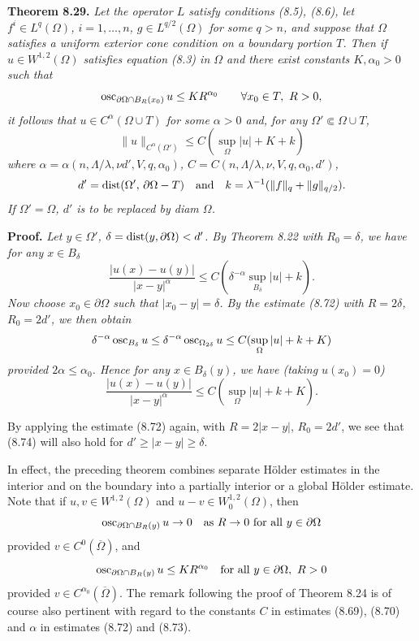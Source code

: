 \noindent \textbf{Theorem 8.29.} \emph{Let the operator $L$ satisfy conditions (8.5), (8.6), let $f^i \in L^q(\Omega)$, $i = 1,\dots,n$, $g \in L^{q/2}(\Omega)$ for some $q > n$, and suppose that $\Omega$ satisfies a uniform exterior cone condition on a boundary portion $T$. Then if $u \in W^{1,2}(\Omega)$ satisfies equation (8.3) in $\Omega$ and there exist constants $K,\alpha_0 > 0$ such that}
\[
\operatorname{osc}_{\partial\Omega \cap B_R(x_0)} u \le K R^{\alpha_0} \qquad \forall x_0 \in T,\ R > 0,
\]
\emph{it follows that $u \in C^\alpha(\Omega \cup T)$ for some $\alpha > 0$ and, for any $\Omega' \Subset \Omega \cup T$,}
\begin{equation}
\|u\|_{C^\alpha(\Omega')} \le C(\sup_{\Omega} |u| + K + k)
\tag{8.73}
\end{equation}
\emph{where $\alpha = \alpha(n, \Lambda/\lambda, \nu d', V, q, \alpha_0)$, $C = C(n, \Lambda/\lambda, \nu, V, q, \alpha_0, d')$,}
\[
d' = \operatorname{dist}(\Omega',\, \partial\Omega - T) \quad \text{and} \quad k = \lambda^{-1}(\|f\|_q + \|g\|_{q/2}).
\]
\emph{If $\Omega' = \Omega$, $d'$ is to be replaced by diam $\Omega$.}

\medskip

\noindent \textbf{Proof.} \emph{Let $y \in \Omega'$, $\delta = \operatorname{dist}(y, \partial\Omega) < d'$. By Theorem 8.22 with $R_0 = \delta$, we have for any $x \in B_\delta$}
\[
\frac{|u(x) - u(y)|}{|x - y|^\alpha} \le C(\delta^{-\alpha}\sup_{B_\delta}|u| + k).
\]
\emph{Now choose $x_0 \in \partial\Omega$ such that $|x_0 - y| = \delta$. By the estimate (8.72) with $R = 2\delta$, $R_0 = 2d'$, we then obtain}
\[
\delta^{-\alpha}\operatorname{osc}_{B_\delta} u \le \delta^{-\alpha}\operatorname{osc}_{\Omega_{2\delta}} u \le C(\sup_{\Omega}|u| + k + K)
\]
\emph{provided $2\alpha \le \alpha_0$. Hence for any $x \in B_\delta(y)$, we have (taking $u(x_0) = 0$)}
\begin{equation}
\frac{|u(x) - u(y)|}{|x - y|^\alpha} \le C(\sup_{\Omega}|u| + k + K).
\tag{8.74}
\end{equation}


By applying the estimate (8.72) again, with $R=2|x-y|$, $R_0=2d'$, we see that (8.74)
will also hold for $d' \ge |x-y| \ge \delta$. \square

\medskip

In effect, the preceding theorem combines separate H\"older estimates in the
interior and on the boundary into a partially interior or a global H\"older estimate.
Note that if $u,v \in W^{1,2}(\Omega)$ and $u-v \in W^{1,2}_0(\Omega)$, then
\[
\operatorname{osc}_{\partial\Omega \cap B_R(y)} u \to 0 \quad \text{as } R \to 0 \text{ for all } y \in \partial\Omega
\]
provided $v \in C^0(\overline{\Omega})$, and
\[
\osc_{\partial\Omega \cap B_R(y)} u \le K R^{\alpha_0} \quad \text{for all } y \in \partial\Omega,\ R>0
\]
provided $v \in C^{\alpha_0}(\overline{\Omega})$. The remark following the proof of Theorem 8.24 is of course also
pertinent with regard to the constants $C$ in estimates (8.69), (8.70) and $\alpha$ in estimates
(8.72) and (8.73).


